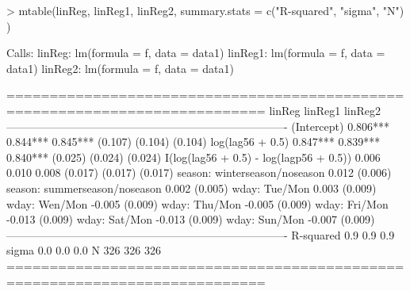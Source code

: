 \documentclass[nojss]{jss}
\begin{document}
\begin{Schunk}
\begin{Sinput}
> mtable(linReg, linReg1, linReg2, summary.stats = c("R-squared", "sigma", "N") )
\end{Sinput}
\begin{Soutput}
Calls:
linReg: lm(formula = f, data = data1)
linReg1: lm(formula = f, data = data1)
linReg2: lm(formula = f, data = data1)

============================================================================
                                            linReg     linReg1    linReg2   
----------------------------------------------------------------------------
  (Intercept)                               0.806***   0.844***   0.845***  
                                           (0.107)    (0.104)    (0.104)    
  log(lag56 + 0.5)                          0.847***   0.839***   0.840***  
                                           (0.025)    (0.024)    (0.024)    
  I(log(lag56 + 0.5) - log(lagp56 + 0.5))   0.006      0.010      0.008     
                                           (0.017)    (0.017)    (0.017)    
  season: winterseason/noseason             0.012                           
                                           (0.006)                          
  season: summerseason/noseason             0.002                           
                                           (0.005)                          
  wday: Tue/Mon                                                   0.003     
                                                                 (0.009)    
  wday: Wen/Mon                                                  -0.005     
                                                                 (0.009)    
  wday: Thu/Mon                                                  -0.005     
                                                                 (0.009)    
  wday: Fri/Mon                                                  -0.013     
                                                                 (0.009)    
  wday: Sat/Mon                                                  -0.013     
                                                                 (0.009)    
  wday: Sun/Mon                                                  -0.007     
                                                                 (0.009)    
----------------------------------------------------------------------------
  R-squared                                    0.9        0.9        0.9    
  sigma                                        0.0        0.0        0.0    
  N                                          326        326        326      
============================================================================
\end{Soutput}
\end{Schunk}
\end{document}

